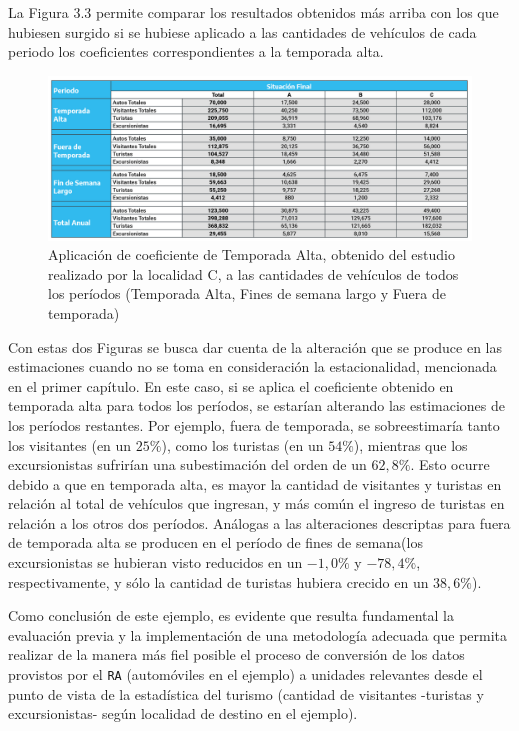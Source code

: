 \documentclass[
]{book}
\begin{document}
La Figura 3.3 permite comparar los resultados obtenidos más arriba con los que hubiesen surgido si se hubiese aplicado a las cantidades de vehículos de cada periodo los coeficientes correspondientes a la temporada alta.

\begin{figure}

{\centering \includegraphics[width=1\linewidth]{imagenes/figura5B} 

}

\caption{Aplicación de coeficiente de Temporada Alta, obtenido del estudio realizado por la localidad C, a las cantidades de vehículos de todos los períodos (Temporada Alta, Fines de semana largo y Fuera de temporada)}\label{fig:temporadaalta}
\end{figure}

\hfill\break
Con estas dos Figuras se busca dar cuenta de la alteración que se produce en las estimaciones cuando no se toma en consideración la estacionalidad, mencionada en el primer capítulo. En este caso, si se aplica el coeficiente obtenido en temporada alta para todos los períodos, se estarían alterando las estimaciones de los períodos restantes. Por ejemplo, fuera de temporada, se sobreestimaría tanto los visitantes (en un \(25\%\)), como los turistas (en un \(54\%\)), mientras que los excursionistas sufrirían una subestimación del orden de un \(62,8\%\). Esto ocurre debido a que en temporada alta, es mayor la cantidad de visitantes y turistas en relación al total de vehículos que ingresan, y más común el ingreso de turistas en relación a los otros dos períodos. Análogas a las alteraciones descriptas para fuera de temporada alta se producen en el período de fines de semana(los excursionistas se hubieran visto reducidos en un \(-1,0\%\) y \(-78,4\%\), respectivamente, y sólo la cantidad de turistas hubiera crecido en un \(38,6\%\)).

Como conclusión de este ejemplo, es evidente que resulta fundamental la evaluación previa y la implementación de una metodología adecuada que permita realizar de la manera más fiel posible el proceso de conversión de los datos provistos por el \texttt{RA} (automóviles en el ejemplo) a unidades relevantes desde el punto de vista de la estadística del turismo (cantidad de visitantes -turistas y excursionistas- según localidad de destino en el ejemplo).
\end{document}
